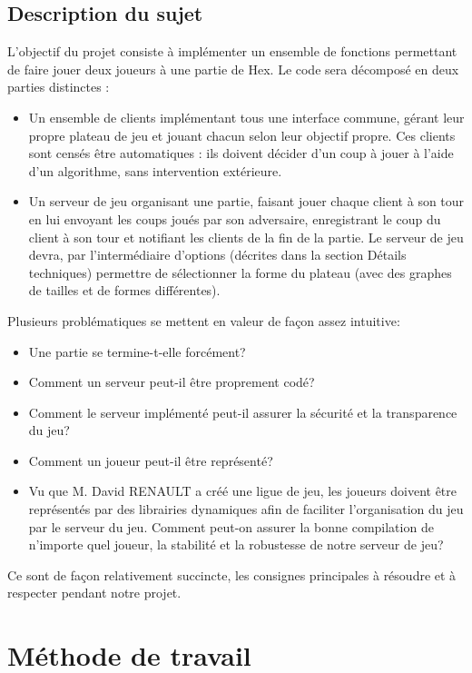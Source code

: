 \documentclass{article}
\begin{document}
    \subsection*{Description du sujet}
L'objectif du projet consiste à implémenter un ensemble de fonctions permettant de faire jouer deux joueurs à une partie de Hex. Le code sera décomposé en deux parties distinctes :
\begin{itemize}
    \item Un ensemble de clients implémentant tous une interface commune, gérant leur propre plateau de jeu et jouant chacun selon leur objectif propre. Ces clients sont censés être automatiques : ils doivent décider d'un coup à jouer à l'aide d'un algorithme, sans intervention extérieure.
    \item Un serveur de jeu organisant une partie, faisant jouer chaque client à son tour en lui envoyant les coups joués par son adversaire, enregistrant le coup du client à son tour et notifiant les clients de la fin de la partie.
Le serveur de jeu devra, par l'intermédiaire d'options (décrites dans la section  Détails techniques) permettre de sélectionner la forme du plateau (avec des graphes de tailles et de formes différentes).
\end{itemize}

 Plusieurs problématiques se mettent en valeur de façon assez intuitive:
 \begin{itemize}
    \item Une partie se termine-t-elle forcément? 
    \item Comment un serveur peut-il être proprement codé?
    \item Comment le serveur implémenté peut-il assurer la sécurité et la transparence du jeu? 
    \item Comment un joueur peut-il être représenté?
    \item Vu que M. David RENAULT a créé une ligue de jeu, les joueurs doivent être représentés par des librairies dynamiques afin de faciliter l'organisation du jeu par le serveur du jeu. Comment peut-on assurer la bonne compilation de n'importe quel joueur, la stabilité et la robustesse de notre serveur de jeu?
    \end{itemize}
  Ce sont de façon relativement succincte, les consignes principales à résoudre et à respecter pendant notre projet.
\newpage
 


 \section{Méthode de travail}
\end{document}
